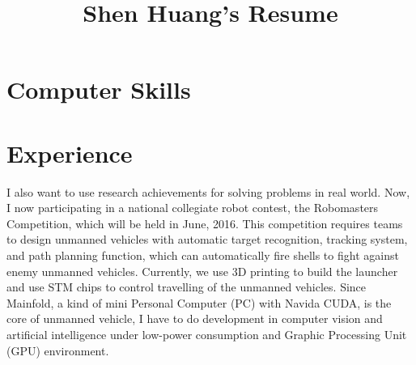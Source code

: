 \documentclass[11pt,letterpaper,final]{moderncv}
\title{Shen Huang's Resume}
\begin{document}
\maketitle

\section{Computer Skills} 
\section{Experience} 
I also want to use research achievements for solving problems in real world. Now, I now participating in a national collegiate robot contest, the Robomasters Competition, which will be held in June, 2016. This competition requires teams to design unmanned vehicles with automatic target recognition, tracking system, and path planning function, which can automatically fire shells to fight against enemy unmanned vehicles. Currently, we use 3D printing to build the launcher and use STM chips to control travelling of the unmanned vehicles. Since Mainfold, a kind of mini Personal Computer (PC) with Navida CUDA, is the core of unmanned vehicle, I have to do development in computer vision and artificial intelligence under low-power consumption and Graphic Processing Unit (GPU) environment. 
\end{document}
